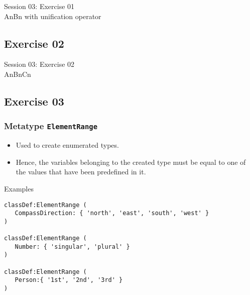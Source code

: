\documentclass[11pt]{beamer}
\begin{document}
\begin{frame}[fragile]
\Huge
\begin{center}
Session 03: Exercise 01\\
AnBn with unification operator
\end{center}
\end{frame}

\subsection{Exercise 02}

\begin{frame}[fragile]
\Huge
\begin{center}
Session 03: Exercise 02\\
AnBnCn
\end{center}
\end{frame}

\subsection{Exercise 03}

\begin{frame}[fragile]
\frametitle{Metatype \texttt{ElementRange}}
\begin{itemize}
	\item Used to create enumerated types.
	\pause
	\item Hence, the variables belonging to the created type must be equal to one of the values that have been predefined in it.
\end{itemize}
\pause
{}
\begin{block}{Examples}
\scriptsize
\begin{lstlisting}[language=lekta]
classDef:ElementRange (
   CompassDirection: { 'north', 'east', 'south', 'west' }
)

classDef:ElementRange (
   Number: { 'singular', 'plural' }
)

classDef:ElementRange (
   Person:{ '1st', '2nd', '3rd' }
)
\end{lstlisting}
\end{block}
\end{frame}
\end{document}
